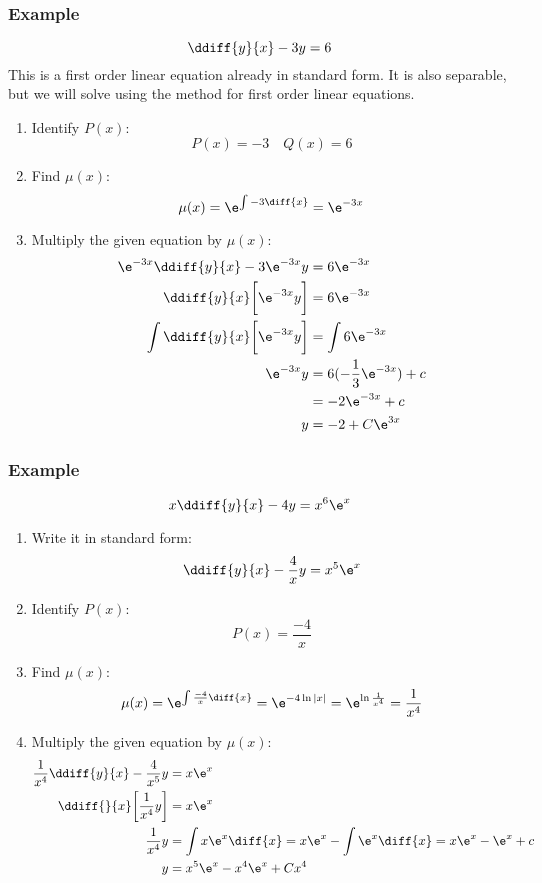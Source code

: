 \documentclass{math}
\begin{document}
\subsubsection*{Example}
\[ \ddiff{y}{x}-3y = 6 \]
This is a first order linear equation already in standard form. It is also
separable, but we will solve using the method for first order linear equations.
\begin{enumerate}
  \item Identify \( P(x) \):
  \[ P(x) = -3 \quad Q(x) = 6 \]
  \item Find \( \mu(x) \):
  \[ \mu(x) = \e^{\int-3\diff{x}} = \e^{-3x} \]
  \item Multiply the given equation by \( \mu(x) \):
  \begin{align*}
    \e^{-3x}\ddiff{y}{x}-3\e^{-3x}y &= 6\e^{-3x} \\
    \ddiff{y}{x}\bigg[\e^{-3x}y\bigg] &= 6\e^{-3x} \\
    \int\ddiff{y}{x}\bigg[\e^{-3x}y\bigg] &= \int 6\e^{-3x} \\
    \e^{-3x}y &= 6(-\frac{1}{3}\e^{-3x})+c \\
    &= -2\e^{-3x}+c \\
    y &= -2+C\e^{3x}
  \end{align*}
\end{enumerate}

\subsubsection*{Example}
\[ x\ddiff{y}{x}-4y = x^6\e^x \]
\begin{enumerate}
  \item Write it in standard form:
  \[ \ddiff{y}{x}-\frac{4}{x}y = x^5\e^x \]
  \item Identify \( P(x) \):
  \[ P(x) = \frac{-4}{x} \]
  \item Find \( \mu(x) \):
  \[ \mu(x) = \e^{\int\frac{-4}{x}\diff{x}} = \e^{-4\ln|x|} =
    \e^{\ln\frac{1}{x^4}} = \frac{1}{x^4} \]
  \item Multiply the given equation by \( \mu(x) \):
  \begin{align*}
    \frac{1}{x^4}\ddiff{y}{x}-\frac{4}{x^5}y &= x\e^x \\
    \ddiff{}{x}\bigg[\frac{1}{x^4}y\bigg] &= x\e^x \\
    \frac{1}{x^4}y &= \int x\e^x\diff{x}
      = x\e^x-\int\e^x\diff{x}
      = x\e^x-\e^x+c \\
    y &= x^5\e^x-x^4\e^x+Cx^4
  \end{align*}
\end{enumerate}
\end{document}
